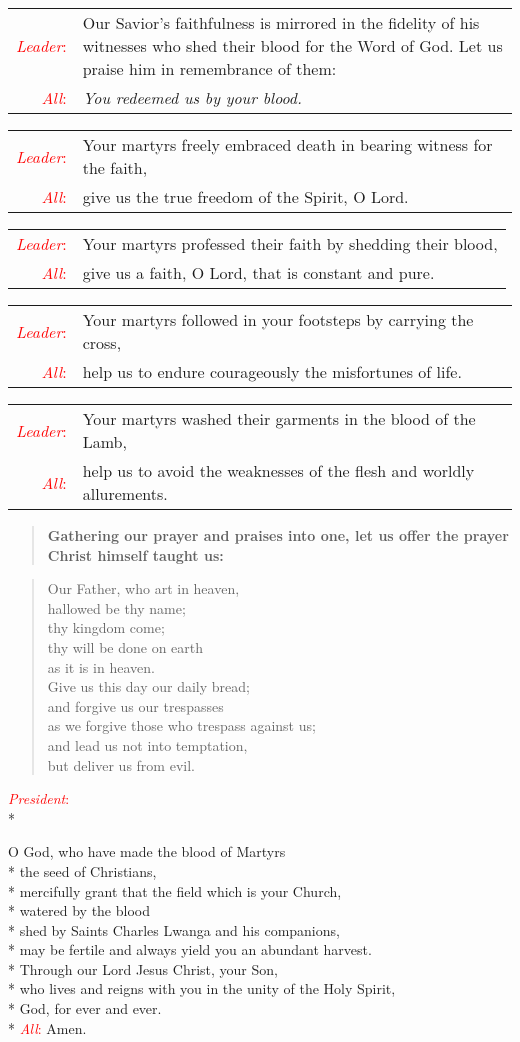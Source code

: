 \documentclass[letterpaper,14pt]{extarticle}
\newcommand{\side}[1]{\flagverse{\textcolor{red}{\textit{#1}}:}}
\newcommand{\sidestar}[1]{\textcolor{red}{\textit{#1}:}}
\newlength{\oldindent}
\newcommand{\antiphon}[2]{
	\setlength{\oldindent}{\vindent}
	\setlength{\vindent}{0em}
	\begin{verse}
	\side{#1} \textbf{#2}
	\end{verse}
	\setlength{\vindent}{\oldindent}
}
\newcommand{\intercession}[2]{
	\begin{tabular}[h]{r p{4.25in}}
		\sidestar{Leader} & #1 \\
		\sidestar{All} & #2
	\end{tabular}}
\begin{document}
\intercession{Our Savior’s faithfulness is mirrored in the fidelity of his witnesses who shed their blood for the Word of God. Let us praise him in remembrance of them:}
{\textit{You redeemed us by your blood.}}

\intercession{Your martyrs freely embraced death in bearing witness for the faith,}
{give us the true freedom of the Spirit, O Lord.}

\intercession{Your martyrs professed their faith by shedding their blood,}
{give us a faith, O Lord, that is constant and pure.}

\intercession{Your martyrs followed in your footsteps by carrying the cross,}
{help us to endure courageously the misfortunes of life.}

\intercession{Your martyrs washed their garments in the blood of the Lamb,}
{help us to avoid the weaknesses of the flesh and worldly allurements.}

\antiphon{Leader}{Gathering our prayer and praises into one, let us offer the prayer Christ himself taught us:}
	
\begin{verse}
	\side{All} Our Father, who art in heaven,\\ %
hallowed be thy name; \\
thy kingdom come; \\
thy will be done on earth \\
as it is in heaven. \\
Give us this day our daily bread; \\
and forgive us our trespasses \\
as we forgive those who trespass against us; \\
and lead us not into temptation, \\
but deliver us from evil.
\end{verse}


\sidestar{President}\\*

O God, who have made the blood of Martyrs \\*
the seed of Christians, \\*
mercifully grant that the field which is your Church, \\*
watered by the blood \\*
shed by Saints Charles Lwanga and his companions, \\*
may be fertile and always yield you an abundant harvest. \\*
Through our Lord Jesus Christ, your Son,\\*
who lives and reigns with you in the unity of the Holy Spirit,\\*
God, for ever and ever.\\*
\sidestar{All} Amen.
\end{document}
